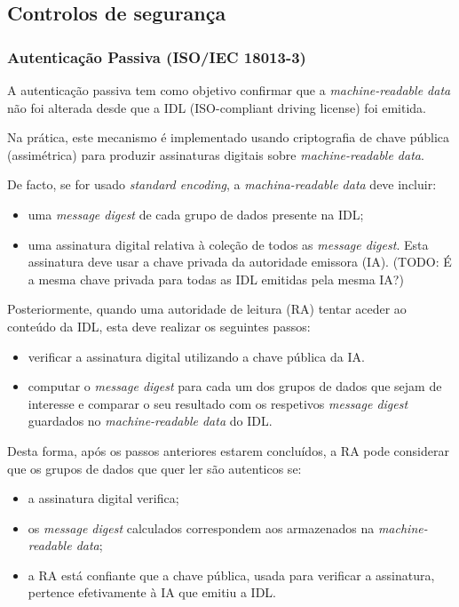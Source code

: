 

\subsection{Controlos de segurança}
\label{sec:orgbc0a271}
\subsubsection{Autenticação Passiva (ISO/IEC 18013-3)}
\label{sec:org479f770}
A autenticação passiva tem como objetivo confirmar que a \emph{machine-readable
data} não foi alterada desde que a IDL (ISO-compliant driving license) foi
emitida.

Na prática, este mecanismo é implementado usando criptografia de chave
pública (assimétrica) para produzir assinaturas digitais sobre
\emph{machine-readable data}.

De facto, se for usado \emph{standard encoding}, a \emph{machina-readable data} deve
incluir:
\begin{itemize}
\item uma \emph{message digest} de cada grupo de dados presente na IDL;
\item uma assinatura digital relativa à coleção de todos as \emph{message digest}. Esta
assinatura deve usar a chave privada da autoridade emissora (IA). (TODO: É
a mesma chave privada para todas as IDL emitidas pela mesma IA?)
\end{itemize}

Posteriormente, quando uma autoridade de leitura (RA) tentar aceder ao
conteúdo da IDL, esta deve realizar os seguintes passos:
\begin{itemize}
\item verificar a assinatura digital utilizando a chave pública da IA.
\item computar o \emph{message digest} para cada um dos grupos de dados que sejam de
interesse e comparar o seu resultado com os respetivos \emph{message digest}
guardados no \emph{machine-readable data} do IDL.
\end{itemize}

Desta forma, após os passos anteriores estarem concluídos, a RA pode
considerar que os grupos de dados que quer ler são autenticos se:
\begin{itemize}
\item a assinatura digital verifica;
\item os \emph{message digest} calculados correspondem aos armazenados na
\emph{machine-readable data};
\item a RA está confiante que a chave pública, usada para verificar a
assinatura, pertence efetivamente à IA que emitiu a IDL.
\end{itemize}

